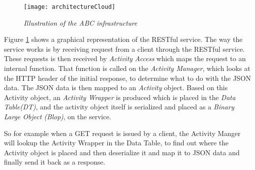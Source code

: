 \begin{figure}[!htbp]
  \centering
    \texttt{[image: architectureCloud]}
  \caption{\emph{Illustration of the ABC infrastructure}}
  \label{fig:infrastructure}
\end{figure}

\par\vspace{\baselineskip}
Figure \ref{fig:infrastructure} shows a graphical representation of the RESTful service.
The way the service works is by receiving request from a client through the RESTful service. These requests is then received by \emph{Activity Access} which maps the request to an internal function. That function is called on the \emph{Activity Manager}, which looks at the HTTP header of the initial response, to determine what to do with the JSON data. The JSON data is then mapped to an \emph{Activity} object. Based on this Activity object, an \emph{Activity Wrapper} is produced which is placed in the \emph{Data Table(DT)}, and the activity object itself is serialized and placed as a \emph{Binary Large Object (Blop)}, on the service.

So for example when a GET request is issued by a client, the Activity Manger will lookup the Activity Wrapper in the Data Table, to find out where the Activity object is placed and then deserialize it and map it to JSON data and finally send it back as a response.
